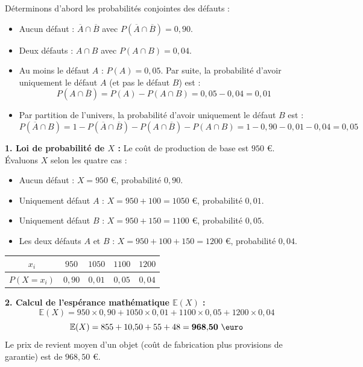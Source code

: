 \documentclass[11pt,a4paper]{article}
\newcommand{\E}{\mathbb{E}}
\begin{document}
\begin{correctionbox}
Déterminons d'abord les probabilités conjointes des défauts :
\begin{itemize}[label=$\bullet$]
    \item \og Aucun défaut \fg{} : $\overline{A} \cap \overline{B}$ avec $P(\overline{A} \cap \overline{B}) = 0{,}90$.
    \item \og Deux défauts \fg{} : $A \cap B$ avec $P(A \cap B) = 0{,}04$.
    \item \og Au moins le défaut $A$ \fg{} : $P(A) = 0{,}05$.
    Par suite, la probabilité d'avoir uniquement le défaut $A$ (et pas le défaut $B$) est :
    \[
    P(A \cap \overline{B}) = P(A) - P(A \cap B) = 0{,}05 - 0{,}04 = 0{,}01
    \]
    \item Par partition de l'univers, la probabilité d'avoir uniquement le défaut $B$ est :
    \[
    P(\overline{A} \cap B) = 1 - P(\overline{A} \cap \overline{B}) - P(A \cap \overline{B}) - P(A \cap B) = 1 - 0{,}90 - 0{,}01 - 0{,}04 = 0{,}05
    \]
\end{itemize}

\textbf{1. Loi de probabilité de $X$ :}
Le coût de production de base est $950$ \euro{}. Évaluons $X$ selon les quatre cas :
\begin{itemize}[label=$\bullet$]
    \item Aucun défaut : $X = 950$ \euro{}, probabilité $0{,}90$.
    \item Uniquement défaut $A$ : $X = 950 + 100 = 1050$ \euro{}, probabilité $0{,}01$.
    \item Uniquement défaut $B$ : $X = 950 + 150 = 1100$ \euro{}, probabilité $0{,}05$.
    \item Les deux défauts $A$ et $B$ : $X = 950 + 100 + 150 = 1200$ \euro{}, probabilité $0{,}04$.
\end{itemize}

\begin{center}
\renewcommand{\arraystretch}{1.4}
\begin{tabular}{|c|c|c|c|c|}
    \hline
    $x_i$ & $950$ & $1050$ & $1100$ & $1200$ \\
    \hline
    $P(X = x_i)$ & $0{,}90$ & $0{,}01$ & $0{,}05$ & $0{,}04$ \\
    \hline
\end{tabular}
\end{center}

\textbf{2. Calcul de l'espérance mathématique $\E(X)$ :}
\[
\E(X) = 950 \times 0{,}90 + 1050 \times 0{,}01 + 1100 \times 0{,}05 + 1200 \times 0{,}04
\]
\[
\E(X) = 855 + 10{,}50 + 55 + 48 = \mathbf{968{,}50\text{ \euro}}
\]
Le prix de revient moyen d'un objet (coût de fabrication plus provisions de garantie) est de $968{,}50$ \euro{}.


\end{correctionbox}
\end{document}
